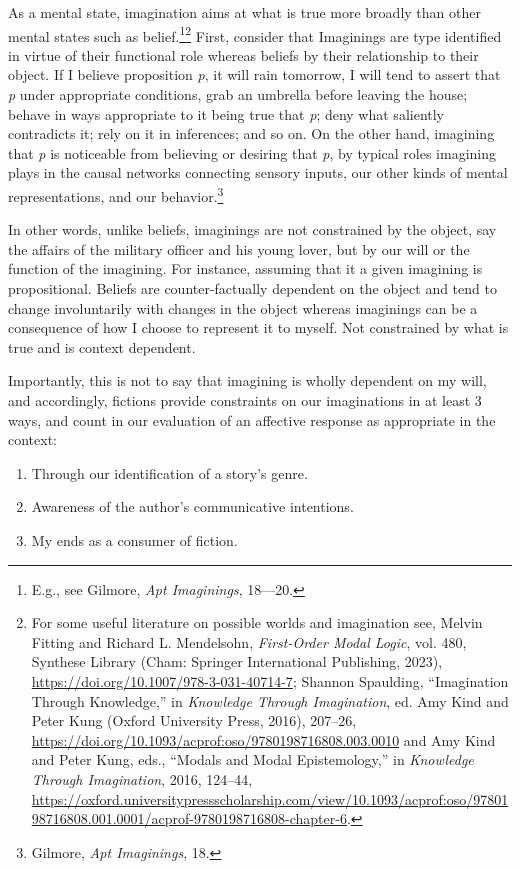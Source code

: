 \documentclass[phdthesis,12pt,final,a4paper]{wuthesis}
\theoremstyle{definition}
\theoremstyle{definition}
\theoremstyle{definition}
\theoremstyle{definition}
\theoremstyle{remark}
\begin{document}
As a mental state, imagination aims at what is true more broadly than other mental states such as belief.\footnote{E.g., see Gilmore, \emph{Apt {Imaginings}}, 18---20.}\footnote{For some useful literature on possible worlds and imagination see, Melvin Fitting and Richard L. Mendelsohn, \emph{First-{Order Modal Logic}}, vol. 480, Synthese {Library} (Cham: Springer International Publishing, 2023), \url{https://doi.org/10.1007/978-3-031-40714-7}; Shannon Spaulding, {``Imagination {Through Knowledge},''} in \emph{Knowledge {Through Imagination}}, ed. Amy Kind and Peter Kung (Oxford University Press, 2016), 207--26, \url{https://doi.org/10.1093/acprof:oso/9780198716808.003.0010} and Amy Kind and Peter Kung, eds., {``Modals and {Modal Epistemology},''} in \emph{Knowledge {Through Imagination}}, 2016, 124--44, \url{https://oxford.universitypressscholarship.com/view/10.1093/acprof:oso/9780198716808.001.0001/acprof-9780198716808-chapter-6}.} First, consider that Imaginings are type identified in virtue of their functional role whereas beliefs by their relationship to their object. If I believe proposition \emph{p}, it will rain tomorrow, I will tend to assert that \emph{p} under appropriate conditions, grab an umbrella before leaving the house; behave in ways appropriate to it being true that \emph{p}; deny what saliently contradicts it; rely on it in inferences; and so on. On the other hand, imagining that \emph{p} is noticeable from believing or desiring that \emph{p}, by typical roles imagining plays in the causal networks connecting sensory inputs, our other kinds of mental representations, and our behavior.\footnote{Gilmore, \emph{Apt {Imaginings}}, 18.}

In other words, unlike beliefs, imaginings are not constrained by the object, say the affairs of the military officer and his young lover, but by our will or the function of the imagining. For instance, assuming that it a given imagining is propositional. Beliefs are counter-factually dependent on the object and tend to change involuntarily with changes in the object whereas imaginings can be a consequence of how I choose to represent it to myself. Not constrained by what is true and is context dependent.

Importantly, this is not to say that imagining is wholly dependent on my will, and accordingly, fictions provide constraints on our imaginations in at least 3 ways, and count in our evaluation of an affective response as appropriate in the context:

\begin{enumerate}
\def\labelenumi{\arabic{enumi}.}
\tightlist
\item
  Through our identification of a story's genre.
\item
  Awareness of the author's communicative intentions.
\item
  My ends as a consumer of fiction.
\end{enumerate}
\end{document}
